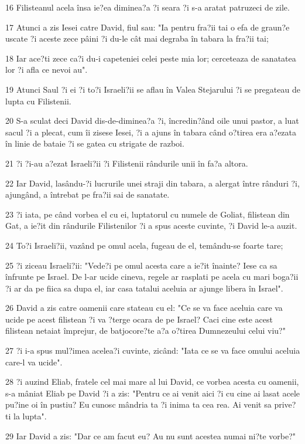 \par 16 Filisteanul acela însa ie?ea diminea?a ?i seara ?i s-a aratat patruzeci de zile.
\par 17 Atunci a zis Iesei catre David, fiul sau: "Ia pentru fra?ii tai o efa de graun?e uscate ?i aceste zece pâini ?i du-le cât mai degraba în tabara la fra?ii tai;
\par 18 Iar ace?ti zece ca?i du-i capeteniei celei peste mia lor; cerceteaza de sanatatea lor ?i afla ce nevoi au".
\par 19 Atunci Saul ?i ei ?i to?i Israeli?ii se aflau în Valea Stejarului ?i se pregateau de lupta cu Filistenii.
\par 20 S-a sculat deci David dis-de-diminea?a ?i, încredin?ând oile unui pastor, a luat sacul ?i a plecat, cum îi zisese Iesei, ?i a ajuns în tabara când o?tirea era a?ezata în linie de bataie ?i se gatea cu strigate de razboi.
\par 21 ?i ?i-au a?ezat Israeli?ii ?i Filistenii rândurile unii în fa?a altora.
\par 22 Iar David, lasându-?i lucrurile unei straji din tabara, a alergat între rânduri ?i, ajungând, a întrebat pe fra?ii sai de sanatate.
\par 23 ?i iata, pe când vorbea el cu ei, luptatorul cu numele de Goliat, filistean din Gat, a ie?it din rândurile Filistenilor ?i a spus aceste cuvinte, ?i David le-a auzit.
\par 24 To?i Israeli?ii, vazând pe omul acela, fugeau de el, temându-se foarte tare;
\par 25 ?i ziceau Israeli?ii: "Vede?i pe omul acesta care a ie?it înainte? Iese ca sa înfrunte pe Israel. De l-ar ucide cineva, regele ar rasplati pe acela cu mari boga?ii ?i ar da pe fiica sa dupa el, iar casa tatalui aceluia ar ajunge libera în Israel".
\par 26 David a zis catre oamenii care stateau cu el: "Ce se va face aceluia care va ucide pe acest filistean ?i va ?terge ocara de pe Israel? Caci cine este acest filistean netaiat împrejur, de batjocore?te a?a o?tirea Dumnezeului celui viu?"
\par 27 ?i i-a spus mul?imea acelea?i cuvinte, zicând: "Iata ce se va face omului aceluia care-l va ucide".
\par 28 ?i auzind Eliab, fratele cel mai mare al lui David, ce vorbea acesta cu oamenii, s-a mâniat Eliab pe David ?i a zis: "Pentru ce ai venit aici ?i cu cine ai lasat acele pu?ine oi în pustiu? Eu cunosc mândria ta ?i inima ta cea rea. Ai venit sa prive?ti la lupta".
\par 29 Iar David a zis: "Dar ce am facut eu? Au nu sunt acestea numai ni?te vorbe?"
